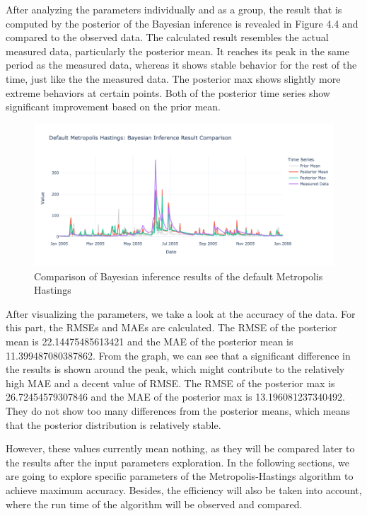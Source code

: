 After analyzing the parameters individually and as a group, the result that is computed by the posterior of the Bayesian inference is revealed in Figure 4.4 and compared to the observed data. The calculated result resembles the actual measured data, particularly the posterior mean. It reaches its peak in the same period as the measured data, whereas it shows stable behavior for the rest of the time, just like the the measured data. The posterior max shows slightly more extreme behaviors at certain points. Both of the posterior time series show significant improvement based on the prior mean. 


\begin{figure}[H]
    \centering
    \includegraphics[width=1\textwidth]{figures/basic_mh/default_mh/default_mh_bayes.png}
    \captionsetup{width=.8\textwidth}
    \caption{Comparison of Bayesian inference results of the default Metropolis Hastings}
    \label{fig:enter-label}
\end{figure}

After visualizing the parameters, we take a look at the accuracy of the data. For this part, the RMSEs and MAEs are calculated. The RMSE of the posterior mean is 22.14475485613421 and the MAE of the posterior mean is 11.399487080387862. From the graph, we can see that a significant difference in the results is shown around the peak, which might contribute to the relatively high MAE and a decent value of RMSE. The RMSE of the posterior max is 26.72454579307846 and the MAE of the posterior max is 13.196081237340492. They do not show too many differences from the posterior means, which means that the posterior distribution is relatively stable. 

However, these values currently mean nothing, as they will be compared later to the results after the input parameters exploration. In the following sections, we are going to explore specific parameters of the Metropolis-Hastings algorithm to achieve maximum accuracy. Besides, the efficiency will also be taken into account, where the run time of the algorithm will be observed and compared.


